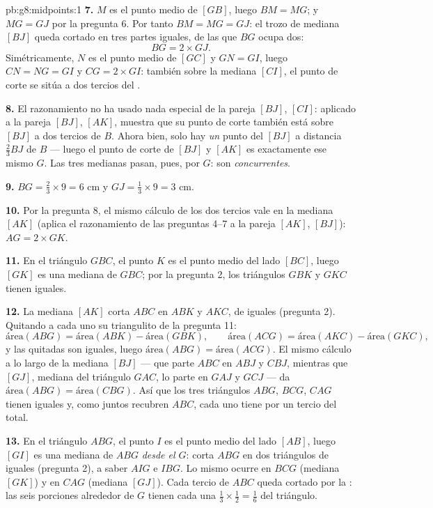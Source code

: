 \begin{solution}{pb:g8:midpoints:1}
\textbf{7.} $M$ es el punto medio de $[GB]$, luego $BM = MG$; y
$MG = GJ$ por la pregunta 6. Por tanto $BM = MG = GJ$: el trozo de mediana
$[BJ]$ queda cortado en tres partes iguales, de las que $BG$ ocupa dos:
\[
BG = 2 \times GJ .
\]
Simétricamente, $N$ es el punto medio de $[GC]$ y $GN = GI$, luego
$CN = NG = GI$ y $CG = 2 \times GI$: también sobre la mediana $[CI]$,
el punto de corte se sitúa a dos tercios del .

\textbf{8.} El razonamiento no ha usado nada especial de la pareja
$[BJ]$, $[CI]$: aplicado a la pareja $[BJ]$, $[AK]$, muestra que su
punto de corte también está sobre $[BJ]$ a dos tercios de
$B$. Ahora bien, solo hay \emph{un} punto del  $[BJ]$ a
distancia $\frac23 BJ$ de $B$ --- luego el punto de corte de
$[BJ]$ y $[AK]$ es exactamente ese mismo $G$. Las tres medianas
pasan, pues, por $G$: son \emph{concurrentes}.

\textbf{9.} $BG = \frac23 \times 9 = 6$ cm y
$GJ = \frac13 \times 9 = 3$ cm.

\textbf{10.} Por la pregunta 8, el mismo cálculo de los dos tercios vale
en la mediana $[AK]$ (aplica el razonamiento de las preguntas 4--7 a
la pareja $[AK]$, $[BJ]$): $AG = 2 \times GK$.

\textbf{11.} En el triángulo $GBC$, el punto $K$ es el punto medio
del lado $[BC]$, luego $[GK]$ es una mediana de $GBC$; por la pregunta
2, los triángulos $GBK$ y $GKC$ tienen  iguales.

\textbf{12.} La mediana $[AK]$ corta $ABC$ en $ABK$ y $AKC$, de
 iguales (pregunta 2). Quitando a cada uno su triangulito
de la pregunta 11:
\[
\text{área}(ABG) = \text{área}(ABK) - \text{área}(GBK),
\qquad
\text{área}(ACG) = \text{área}(AKC) - \text{área}(GKC),
\]
y las  quitadas son iguales, luego
$\text{área}(ABG) = \text{área}(ACG)$. El mismo cálculo
a lo largo de la mediana $[BJ]$ --- que parte $ABC$ en $ABJ$ y
$CBJ$, mientras que $[GJ]$, mediana del triángulo $GAC$, lo parte
en $GAJ$ y $GCJ$ --- da
$\text{área}(ABG) = \text{área}(CBG)$. Así que los tres triángulos
$ABG$, $BCG$, $CAG$ tienen  iguales y, como juntos
recubren $ABC$, cada uno tiene por  un tercio del total.

\textbf{13.} En el triángulo $ABG$, el punto $I$ es el punto medio
del lado $[AB]$, luego $[GI]$ es una mediana de $ABG$ \emph{desde el
 $G$}: corta $ABG$ en dos triángulos de  iguales
(pregunta 2), a saber $AIG$ e $IBG$. Lo mismo ocurre en $BCG$
(mediana $[GK]$) y en $CAG$ (mediana $[GJ]$). Cada tercio de
$ABC$ queda cortado por la : las seis porciones alrededor de $G$ tienen cada una 
$\frac13 \times \frac12 = \frac16$ del triángulo.


\end{solution}
